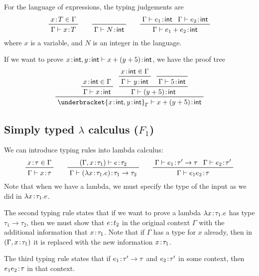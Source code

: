 \documentclass[class=scrartcl]{standalone}
\begin{document}
\begin{example}
  For the language of expressions, the typing judgements are
  \[
    \prftree{x \of T \in \Gamma}
            {\Gamma \vdash x \of T} \qquad
    \prfaxiom{\Gamma \vdash N \of \pint} \qquad
    \prftree{\Gamma \vdash e_1 \of \pint}
            {\Gamma \vdash e_2 \of \pint}
            {\Gamma \vdash e_1 + e_2 \of \pint}
  \]
  where \(x\) is a variable, and \(N\) is an integer in the language.

  If we want to prove \(x {\hspace{0.1111em}:\hspace{0.1111em}} \textsf{int}, y {\hspace{0.1111em}:\hspace{0.1111em}} \textsf{int} \vdash
                        x + (y + 5) {\hspace{0.1111em}:\hspace{0.1111em}} \textsf{int}\),
  we have the proof tree
  \[
    \prftree{\prftree{x \of \pint \in \Gamma}
                     {\Gamma \vdash x \of \pint}}
            {\prftree{\prftree{x \of \pint \in \Gamma}
                              {\Gamma \vdash y \of \pint}}
                     {\prfaxiom{\Gamma \vdash 5 \of \pint}}
                     {\Gamma \vdash (y + 5) \of \pint}}
            {\underbracket{x \of \pint, y \of \pint}_\Gamma
             \vdash x + (y + 5) \of \pint}
  \]
\end{example}

\subsection{Simply typed \texorpdfstring{\(\lambda\)}{lambda}
            calculus (\texorpdfstring{\(F_1\)}{F1})}
We can introduce typing rules into lambda calculus:
\[
  \prftree{x \of \tau \in \Gamma}
          {\Gamma \vdash x \of \tau} \qquad
  \prftree{(\Gamma, x \of \tau_1) \vdash e \of \tau_2}
          {\Gamma \vdash (\lambda x\of \tau_1. e) \of \tau_1 \to \tau_2} \qquad
  \prftree{\Gamma \vdash e_1 \of \tau' \to \tau}
          {\Gamma \vdash e_2 \of \tau'}
          {\Gamma \vdash e_1 e_2 \of \tau}
\]
Note that when we have a lambda, we must specify the type of the input
as we did in \(\lambda x {\hspace{0.1111em}:\hspace{0.1111em}} \tau_1. e\).

The second typing rule states that if we want to prove
a lambda \(\lambda x {\hspace{0.1111em}:\hspace{0.1111em}} \tau_1. e\) has type \(\tau_1 \to \tau_2\),
then we must show that \(e {\hspace{0.1111em}:\hspace{0.1111em}} t_2\) in the original context \(\Gamma\)
with the additional information that \(x {\hspace{0.1111em}:\hspace{0.1111em}} \tau_1\).
Note that if \(\Gamma\) has a type for \(x\) already,
then in \((\Gamma, x {\hspace{0.1111em}:\hspace{0.1111em}} \tau_1)\) it is replaced with
the new information \(x {\hspace{0.1111em}:\hspace{0.1111em}} \tau_1\).

The third typing rule states that
if \(e_1 {\hspace{0.1111em}:\hspace{0.1111em}} \tau' \to \tau\) and \(e_2 {\hspace{0.1111em}:\hspace{0.1111em}} \tau'\) in some context,
then \(e_1 e_2 {\hspace{0.1111em}:\hspace{0.1111em}} \tau\) in that context.
\end{document}
